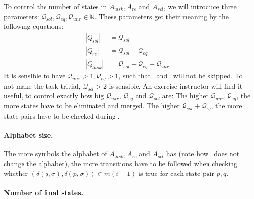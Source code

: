 To control the number of states in $A_{task}, A_{re}$ and $A_{sol}$, we will introduce three parameters: $\mathcal{Q}_{sol}, \mathcal{Q}_{eq}, \mathcal{Q}_{unr} \in \mathbb{N}$. These parameters get their meaning by the following equations:
\begin{align*}
    |Q_{sol}| &= \mathcal{Q}_{sol} \\
    |Q_{re}| &= \mathcal{Q}_{sol} + \mathcal{Q}_{eq} \\
    |Q_{task}| &= \mathcal{Q}_{sol} + \mathcal{Q}_{eq} + \mathcal{Q}_{unr}
\end{align*}
It is sensible to have $\mathcal{Q}_{unr} > 1, \mathcal{Q}_{eq} > 1$, such that \RemUnr\ and \RemEq\ will not be skipped. To not make the task trivial, $\mathcal{Q}_{sol} > 2$ is sensible. An exercise instructor will find it useful, to control exactly how big $\mathcal{Q}_{unr}$, $\mathcal{Q}_{eq}$ and $\mathcal{Q}_{sol}$ are: The higher $\mathcal{Q}_{unr}, \mathcal{Q}_{eq}$, the more states have to be eliminated and merged. The higher $\mathcal{Q}_{sol} + \mathcal{Q}_{eq}$, the more state pairs have to be checked during \CompDist.


\paragraph*{Alphabet size.}

The more symbols the alphabet of $A_{task}, A_{re}$ and $A_{sol}$ has (note how \MinAlg\ does not change the alphabet), the more transitions have to be followed when checking whether $(\delta(q,\sigma),\delta(p,\sigma))\in m(i-1)$ is true for each state pair $p,q$.

\paragraph*{Number of final states.}

